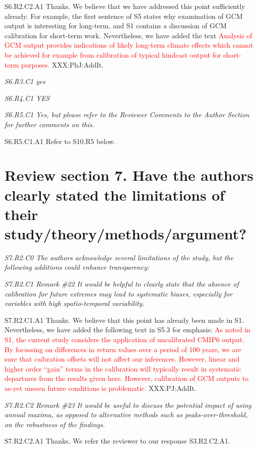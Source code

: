 \documentclass[a4paper,10pt]{article}
\newcommand{\ed}[1]{\textcolor{red}{#1}}
\begin{document}
	S6.R2.C2.A1 Thanks. We believe that we have addressed this point sufficiently already. For example, the first sentence of S5 states why examination of GCM output is interesting for long-term, and S1 contains a discussion of GCM calibration for short-term work. Nevertheless, we have added the text \ed{Analysis of GCM output provides indications of likely long-term climate effects which cannot be achieved for example from calibration of typical hindcast output for short-term purposes.} XXX:PhJ:AddIt. 
	
	\emph{S6.R3.C1 yes}

	\emph{S6.R4.C1 YES}

	\emph{S6.R5.C1 Yes, but please refer to the Reviewer Comments to the Author Section for further comments on this.}

	S6.R5.C1.A1 Refer to S10.R5 below.

	\section*{Review section 7. Have the authors clearly stated the limitations of their study/theory/methods/argument?}

	\emph{S7.R2.C0 The authors acknowledge several limitations of the study, but the following additions could enhance transparency:}

	\emph{S7.R2.C1 Remark \#22 It would be helpful to clearly state that the absence of calibration for future extremes may lead to systematic biases, especially for variables with high spatio-temporal variability.}

	S7.R2.C1.A1 Thanks. We believe that this point has already been made in S1. Nevertheless, we have added the following text in S5.3 for emphasis: \ed{As noted in S1, the current study considers the application of uncalibrated CMIP6 output. By focussing on differences in return values over a period of 100 years, we are sure that caibration offsets will not affect our inferences. However, linear and higher order ``gain'' terms in the calibration will typically result in systematic departures from the results given here. However, calibration of GCM outputs to as-yet unseen future conditions is problematic.} XXX:PJ:AddIt.

	\emph{S7.R2.C2 Remark \#23 It would be useful to discuss the potential impact of using annual maxima, as opposed to alternative methods such as peaks-over-threshold, on the robustness of the findings.}

	S7.R2.C2.A1 Thanks. We refer the reviewer to our response S3.R2.C2.A1.
\end{document}
